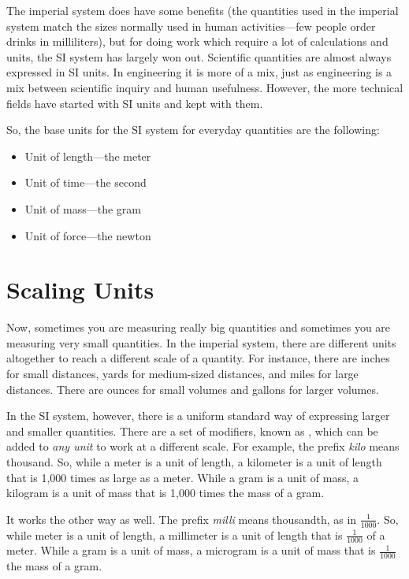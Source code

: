 The imperial system does have some benefits (the quantities used in the imperial system match the sizes normally used in human activities---few people order drinks in milliliters), but for doing work which require a lot of calculations and units, the SI system has largely won out.
Scientific quantities are almost always expressed in SI units.  
In engineering it is more of a mix, just as engineering is a mix between scientific inquiry and human usefulness.
However, the more technical fields have started with SI units and kept with them.

So, the base units for the SI system for everyday quantities are the following:

\begin{itemize}
\item Unit of length---the meter
\item Unit of time---the second
\item Unit of mass---the gram
\item Unit of force---the newton
\end{itemize}

\section{Scaling Units}

Now, sometimes you are measuring really big quantities and sometimes you are measuring very small quantities.
In the imperial system, there are different units altogether to reach a different scale of a quantity.
For instance, there are inches for small distances, yards for medium-sized distances, and miles for large distances.
There are ounces for small volumes and gallons for larger volumes.

In the SI system, however, there is a uniform standard way of expressing larger and smaller quantities.
There are a set of modifiers, known as , which can be added to \emph{any unit} to work at a different scale.
For example, the prefix \emph{kilo} means thousand.
So, while a meter is a unit of length, a kilometer is a unit of length that is 1,000 times as large as a meter.
While a gram is a unit of mass, a kilogram is a unit of mass that is 1,000 times the mass of a gram.

It works the other way as well.
The prefix \emph{milli} means thousandth, as in $\frac{1}{1000}$.
So, while meter is a unit of length, a millimeter is a unit of length that is $\frac{1}{1000}$ of a meter.
While a gram is a unit of mass, a microgram is a unit of mass that is $\frac{1}{1000}$ the mass of a gram.

